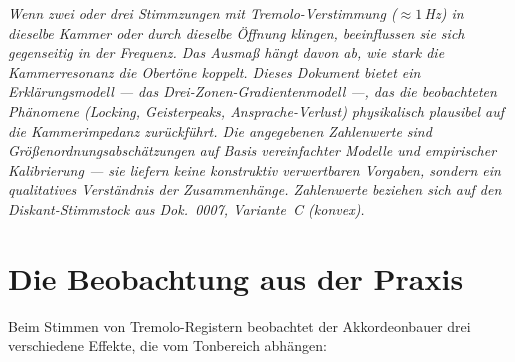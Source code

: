 \documentclass[11pt,a4paper]{article}
\begin{document}
\hbmaketitle

{\small\itshape Wenn zwei oder drei Stimmzungen mit Tremolo-Verstimmung ($\approx 1$\,Hz) in dieselbe Kammer oder durch dieselbe Öffnung klingen, beeinflussen sie sich gegenseitig in der Frequenz. Das Ausmaß hängt davon ab, wie stark die Kammerresonanz die Obertöne koppelt. Dieses Dokument bietet ein Erklärungsmodell --- das Drei-Zonen-Gradientenmodell ---, das die beobachteten Phänomene (Locking, Geisterpeaks, Ansprache-Verlust) physikalisch plausibel auf die Kammerimpedanz zurückführt. Die angegebenen Zahlenwerte sind Größenordnungsabschätzungen auf Basis vereinfachter Modelle und empirischer Kalibrierung --- sie liefern keine konstruktiv verwertbaren Vorgaben, sondern ein qualitatives Verständnis der Zusammenhänge. Zahlenwerte beziehen sich auf den Diskant-Stimmstock aus Dok.~0007, Variante~C (konvex).}

\vspace{4mm}

\begin{table}[H]
\centering\small
{}
\end{table}

\section{Die Beobachtung aus der Praxis}

Beim Stimmen von Tremolo-Registern beobachtet der Akkordeonbauer drei verschiedene Effekte, die vom Tonbereich abhängen:
\end{document}
